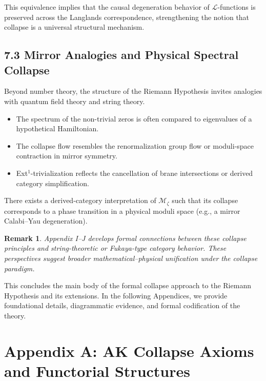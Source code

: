 \documentclass[11pt]{article}
\newtheorem{remark}[theorem]{Remark}
\begin{document}
This equivalence implies that the causal degeneration behavior of $\mathcal{L}$-functions is preserved across the Langlands correspondence,  
strengthening the notion that collapse is a universal structural mechanism.

\subsection{7.3 Mirror Analogies and Physical Spectral Collapse}

Beyond number theory, the structure of the Riemann Hypothesis invites analogies with quantum field theory and string theory.

\begin{itemize}
    \item The spectrum of the non-trivial zeros is often compared to eigenvalues of a hypothetical Hamiltonian.
    \item The collapse flow resembles the renormalization group flow or moduli-space contraction in mirror symmetry.
    \item Ext$^1$-trivialization reflects the cancellation of brane intersections or derived category simplification.
\end{itemize}

\begin{conjecture}
There exists a derived-category interpretation of $\mathcal{M}_\zeta$ such that its collapse corresponds to a phase transition in a physical moduli space  
(e.g., a mirror Calabi–Yau degeneration).
\end{conjecture}

\begin{remark}
Appendix I–J develops formal connections between these collapse principles and string-theoretic or Fukaya-type category behavior.  
These perspectives suggest broader mathematical–physical unification under the collapse paradigm.
\end{remark}

This concludes the main body of the formal collapse approach to the Riemann Hypothesis and its extensions.  
In the following Appendices, we provide foundational details, diagrammatic evidence, and formal codification of the theory.




\appendix
\section*{Appendix A: AK Collapse Axioms and Functorial Structures}
\end{document}
